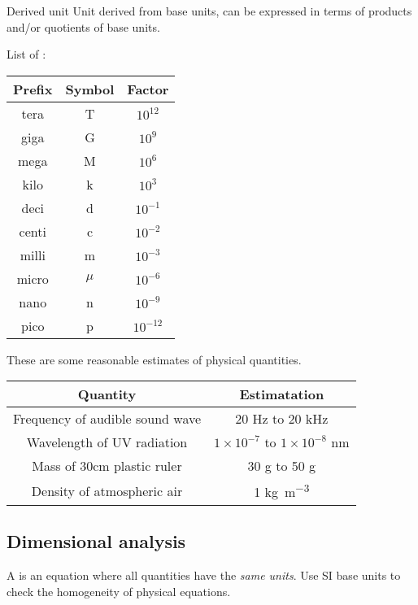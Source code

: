 \begin{defn}{Derived unit}{}
Unit derived from base units, can be expressed in terms of products and/or quotients of base units.
\end{defn}
\pagebreak
List of :
\begin{table}[H]
	\centering
	\begin{tabular}{ccc} 
	\hline\hline
	\textbf{Prefix} & \textbf{Symbol} & \textbf{Factor} \\
	\hline
	tera & T & ${10}^{12}$ \\ 
	giga & G & ${10}^{9}$ \\
	mega & M & ${10}^{6}$ \\
	kilo & k & ${10}^{3}$ \\
	deci & d & ${10}^{-1}$ \\
	centi & c & ${10}^{-2}$ \\ 
	milli & m & ${10}^{-3}$ \\
	micro & $\mu$ & ${10}^{-6}$ \\ 
	nano & n & ${10}^{-9}$ \\
	pico & p & ${10}^{-12}$ \\
	\hline\hline
	\end{tabular}
\end{table}

These are some reasonable estimates of physical quantities.
\begin{table}[H]
	\centering
	\begin{tabular}{cc} 
	\hline\hline
	\textbf{Quantity} & \textbf{Estimatation} \\ 
	\hline
	Frequency of audible sound wave & 20 Hz to 20 kHz \\ 
	Wavelength of UV radiation & $1 \times 10^{-7}$ to $1 \times 10^{-8}$ nm \\
	Mass of 30cm plastic ruler & 30 \unit{g} to 50 \unit{g} \\
	Density of atmospheric air & 1 \unit{kg.m^{-3}} \\
	\hline\hline
	\end{tabular}
\end{table}

\subsection{Dimensional analysis}
A  is an equation where all quantities have the \emph{same units}. Use SI base units to check the homogeneity of physical equations.


